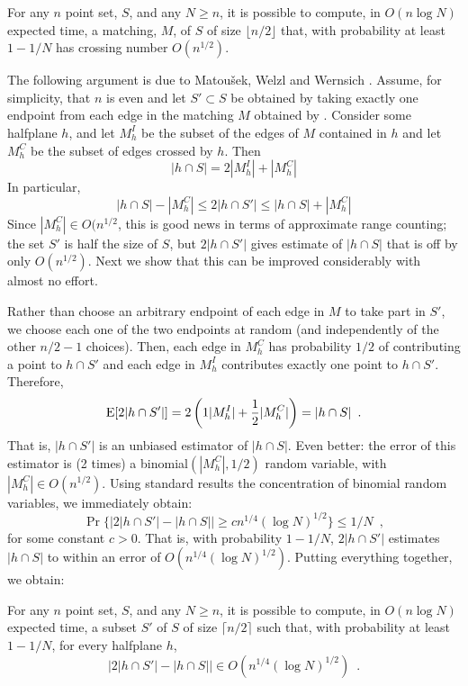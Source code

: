 \documentclass{patmorin}
\begin{document}
\begin{cor}
  For any $n$ point set, $S$, and any $N\ge n$, it is possible to
  compute, in $O(n\log N)$ expected time, a matching, $M$, of $S$ of
  size $\lfloor n/2\rfloor$ that, with probability at least $1-1/N$
  has crossing number $O(n^{1/2})$.
\end{cor}

The following argument is due to Matou\v{s}ek, Welzl and Wernsich
\cite[Lemma~2.5]{mww93}.  Assume, for simplicity, that $n$ is even and let
$S'\subset S$ be obtained by taking exactly one endpoint from each edge in
the matching $M$ obtained by .  Consider some halfplane
$h$,  and let $M^{I}_h$ be the subset of the edges of $M$ contained in
$h$ and let $M^{C}_h$ be the subset of edges crossed by $h$. Then
\[
     |h\cap S| = 2|M^{I}_h| + |M^{C}_h|
\] 
In particular,
\[
     |h\cap S|- |M^{C}_h| \le 2|h\cap S'| \le |h\cap S| + |M^{C}_h| 
\]
Since $|M^C_h|\in O(n^{1/2}$, this is good news in terms of approximate
range counting;  the set $S'$ is half the size of $S$, but $2|h\cap
S'|$ gives estimate of $|h\cap S|$ that is off by only $O(n^{1/2})$.
Next we show that this can be improved considerably with almost no effort.

Rather than choose an arbitrary endpoint of each edge in $M$ to
take part in $S'$, we choose each one of the two endpoints at random
(and independently of the other $n/2-1$ choices).  Then, each edge in
$M^{C}_h$ has probability $1/2$ of contributing a point to $h\cap S'$
and each edge in $M^{I}_h$ contributes exactly one point to $h\cap S'$.
Therefore,
\[
    \mathrm{E}[2|h\cap S'|]
      = 2\left(1|M^{I}_h| + \frac{1}{2}|M^{C}_h|\right) = |h\cap S| \enspace .
\]
That is, $|h\cap S'|$ is an unbiased estimator of $|h\cap
S|$.  Even better: the error of this estimator is (2 times) a
binomial$(|M^{C}_h|,1/2)$ random variable, with $|M^{C}_h|\in
O(n^{1/2})$.  Using standard results the concentration of binomial random
variables, we immediately obtain:
\[
   \Pr\{\left|2|h \cap S'| - |h\cap S|\right| \ge c n^{1/4}(\log N)^{1/2}\} 
       \le 1/N \enspace ,
\]
for some constant $c>0$.  That is, with probability $1-1/N$, $2|h\cap S'|$
estimates $|h\cap S|$ to within an error of $O(n^{1/4}(\log N)^{1/2})$.
Putting everything together, we obtain:

\begin{lem}
  For any $n$ point set, $S$, and any $N\ge n$, it is possible to
  compute, in $O(n\log N)$ expected time, a subset $S'$ of $S$ of 
  size $\lceil n/2\rceil$ such that, 
  with probability at least $1-1/N$, for every halfplane $h$,
  \[
     \left|2|h\cap S'| - |h\cap S|\right| \in O(n^{1/4}(\log N)^{1/2}) \enspace .
  \]
\end{lem}
\end{document}
